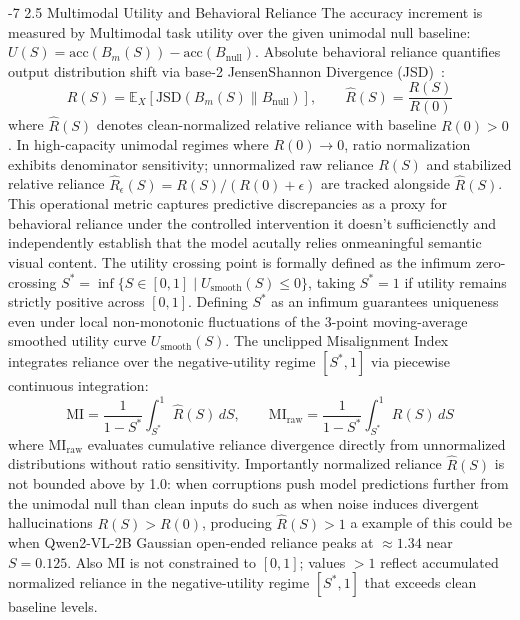 \documentclass[graybox]{svmult}
\makeatletter
\newcommand{\mi}{\text{MI}}
\newcommand{\jsd}{\text{JSD}}
\renewcommand\subsection{\@startsection{subsection}{2}{\z@}%
  {-7\p@ \@plus -2\p@ \@minus -1\p@}%
  {2.5\p@ \@plus 1\p@ \@minus 1\p@}%
  {\normalfont\normalsize\bfseries\boldmath}}
\makeatother
\begin{document}
\subsection{Multimodal Utility and Behavioral Reliance}
The accuracy increment is measured by Multimodal task utility over the given unimodal null baseline: $U(S) = \text{acc}(B_m(S)) - \text{acc}(B_{\text{null}})$. Absolute behavioral reliance quantifies output distribution shift via base-2 JensenShannon Divergence (JSD)~\cite{lin1991divergence}:
\begin{equation}
R(S) = \mathbb{E}_X [\jsd(B_m(S) \parallel B_{\text{null}})], \qquad \hat{R}(S) = \frac{R(S)}{R(0)}
\end{equation}
where $\hat{R}(S)$ denotes clean-normalized relative reliance with baseline $R(0) > 0$. In high-capacity unimodal regimes where $R(0) \to 0$, ratio normalization exhibits denominator sensitivity; unnormalized raw reliance $R(S)$ and stabilized relative reliance $\hat{R}_{\epsilon}(S) = R(S)/(R(0) + \epsilon)$ are tracked alongside $\hat{R}(S)$. This operational metric captures predictive discrepancies as a proxy for behavioral reliance under the controlled intervention it doesn't sufficienctly and independently establish that the model acutally relies onmeaningful semantic visual content. The utility crossing point is formally defined as the infimum zero-crossing $S^* = \inf \{S \in [0,1] \mid U_{\text{smooth}}(S) \le 0\}$, taking $S^* = 1$ if utility remains strictly positive across $[0,1]$. Defining $S^*$ as an infimum guarantees uniqueness even under local non-monotonic fluctuations of the 3-point moving-average smoothed utility curve $U_{\text{smooth}}(S)$. The unclipped Misalignment Index integrates reliance over the negative-utility regime $[S^*, 1]$ via piecewise continuous integration:
\begin{equation}
\mi = \frac{1}{1 - S^*} \int_{S^*}^1 \hat{R}(S) \, dS, \qquad \mi_{\text{raw}} = \frac{1}{1 - S^*} \int_{S^*}^1 R(S) \, dS
\end{equation}
where $\mi_{\text{raw}}$ evaluates cumulative reliance divergence directly from unnormalized distributions without ratio sensitivity.
Importantly normalized reliance $\hat{R}(S)$ is not bounded above by 1.0: when corruptions push model predictions further from the unimodal null than clean inputs do such as when noise induces divergent hallucinations $R(S) > R(0)$, producing $\hat{R}(S) > 1$ a example of this could be when Qwen2-VL-2B Gaussian open-ended reliance peaks at $\approx 1.34$ near $S = 0.125$. Also $\mi$ is not constrained to $[0,1]$; values $> 1$ reflect accumulated normalized reliance in the negative-utility regime $[S^*, 1]$ that exceeds clean baseline levels.
\end{document}
